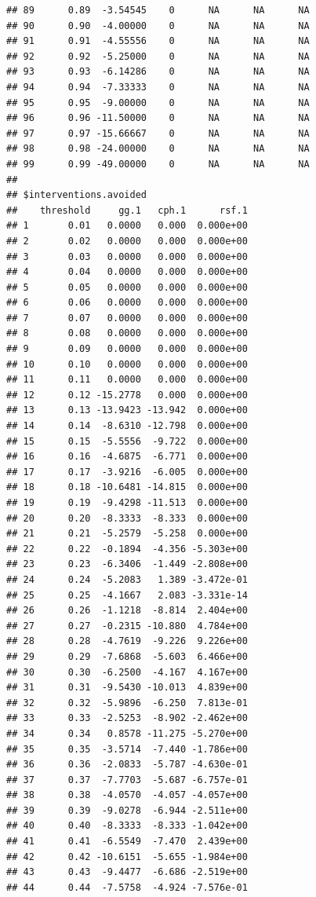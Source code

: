 \documentclass{article}\usepackage[]{graphicx}\usepackage[]{color}
\makeatletter
\newenvironment{kframe}{%
 \def\at@end@of@kframe{}%
 \ifinner\ifhmode%
  \def\at@end@of@kframe{\end{minipage}}%
  \begin{minipage}{\columnwidth}%
 \fi\fi%
 \def\FrameCommand##1{\hskip\@totalleftmargin \hskip-\fboxsep
 \colorbox{shadecolor}{##1}\hskip-\fboxsep
     \hskip-\linewidth \hskip-\@totalleftmargin \hskip\columnwidth}%
 \MakeFramed {\advance\hsize-\width
   \@totalleftmargin\z@ \linewidth\hsize
   \@setminipage}}%
 {\par\unskip\endMakeFramed%
 \at@end@of@kframe}
\newenvironment{knitrout}{}{} %
\makeatother
\begin{document}
\begin{knitrout}
\begin{kframe}
\begin{verbatim}
## 89      0.89  -3.54545    0      NA      NA      NA
## 90      0.90  -4.00000    0      NA      NA      NA
## 91      0.91  -4.55556    0      NA      NA      NA
## 92      0.92  -5.25000    0      NA      NA      NA
## 93      0.93  -6.14286    0      NA      NA      NA
## 94      0.94  -7.33333    0      NA      NA      NA
## 95      0.95  -9.00000    0      NA      NA      NA
## 96      0.96 -11.50000    0      NA      NA      NA
## 97      0.97 -15.66667    0      NA      NA      NA
## 98      0.98 -24.00000    0      NA      NA      NA
## 99      0.99 -49.00000    0      NA      NA      NA
## 
## $interventions.avoided
##    threshold     gg.1   cph.1      rsf.1
## 1       0.01   0.0000   0.000  0.000e+00
## 2       0.02   0.0000   0.000  0.000e+00
## 3       0.03   0.0000   0.000  0.000e+00
## 4       0.04   0.0000   0.000  0.000e+00
## 5       0.05   0.0000   0.000  0.000e+00
## 6       0.06   0.0000   0.000  0.000e+00
## 7       0.07   0.0000   0.000  0.000e+00
## 8       0.08   0.0000   0.000  0.000e+00
## 9       0.09   0.0000   0.000  0.000e+00
## 10      0.10   0.0000   0.000  0.000e+00
## 11      0.11   0.0000   0.000  0.000e+00
## 12      0.12 -15.2778   0.000  0.000e+00
## 13      0.13 -13.9423 -13.942  0.000e+00
## 14      0.14  -8.6310 -12.798  0.000e+00
## 15      0.15  -5.5556  -9.722  0.000e+00
## 16      0.16  -4.6875  -6.771  0.000e+00
## 17      0.17  -3.9216  -6.005  0.000e+00
## 18      0.18 -10.6481 -14.815  0.000e+00
## 19      0.19  -9.4298 -11.513  0.000e+00
## 20      0.20  -8.3333  -8.333  0.000e+00
## 21      0.21  -5.2579  -5.258  0.000e+00
## 22      0.22  -0.1894  -4.356 -5.303e+00
## 23      0.23  -6.3406  -1.449 -2.808e+00
## 24      0.24  -5.2083   1.389 -3.472e-01
## 25      0.25  -4.1667   2.083 -3.331e-14
## 26      0.26  -1.1218  -8.814  2.404e+00
## 27      0.27  -0.2315 -10.880  4.784e+00
## 28      0.28  -4.7619  -9.226  9.226e+00
## 29      0.29  -7.6868  -5.603  6.466e+00
## 30      0.30  -6.2500  -4.167  4.167e+00
## 31      0.31  -9.5430 -10.013  4.839e+00
## 32      0.32  -5.9896  -6.250  7.813e-01
## 33      0.33  -2.5253  -8.902 -2.462e+00
## 34      0.34   0.8578 -11.275 -5.270e+00
## 35      0.35  -3.5714  -7.440 -1.786e+00
## 36      0.36  -2.0833  -5.787 -4.630e-01
## 37      0.37  -7.7703  -5.687 -6.757e-01
## 38      0.38  -4.0570  -4.057 -4.057e+00
## 39      0.39  -9.0278  -6.944 -2.511e+00
## 40      0.40  -8.3333  -8.333 -1.042e+00
## 41      0.41  -6.5549  -7.470  2.439e+00
## 42      0.42 -10.6151  -5.655 -1.984e+00
## 43      0.43  -9.4477  -6.686 -2.519e+00
## 44      0.44  -7.5758  -4.924 -7.576e-01

\end{verbatim}
\end{kframe}
\end{knitrout}
\end{document}

